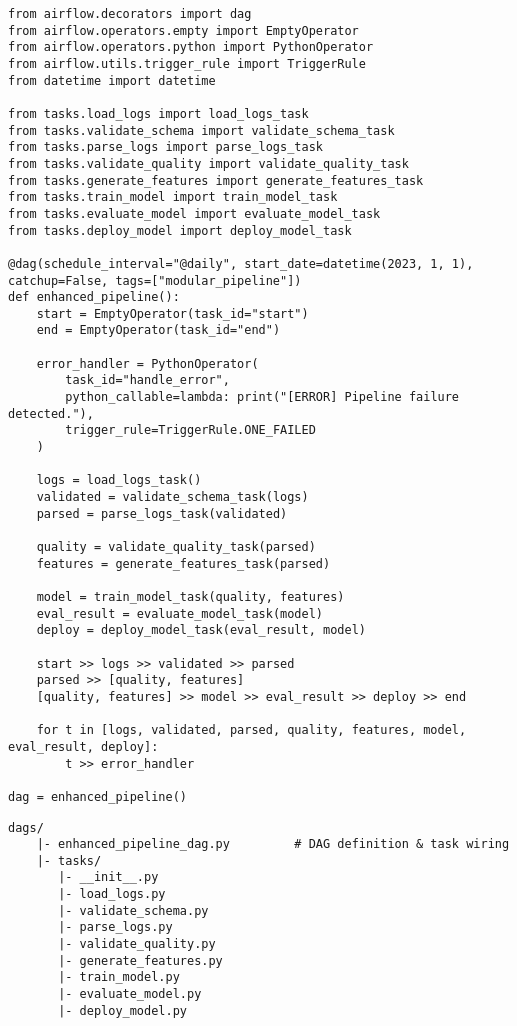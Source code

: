 \begin{lstlisting}[caption={Airflow DAG with parallel data quality validation and feature engineering before training.}, label={lst:airflowdag_parallel}]
from airflow.decorators import dag
from airflow.operators.empty import EmptyOperator
from airflow.operators.python import PythonOperator
from airflow.utils.trigger_rule import TriggerRule
from datetime import datetime

from tasks.load_logs import load_logs_task
from tasks.validate_schema import validate_schema_task
from tasks.parse_logs import parse_logs_task
from tasks.validate_quality import validate_quality_task
from tasks.generate_features import generate_features_task
from tasks.train_model import train_model_task
from tasks.evaluate_model import evaluate_model_task
from tasks.deploy_model import deploy_model_task

@dag(schedule_interval="@daily", start_date=datetime(2023, 1, 1), catchup=False, tags=["modular_pipeline"])
def enhanced_pipeline():
    start = EmptyOperator(task_id="start")
    end = EmptyOperator(task_id="end")

    error_handler = PythonOperator(
        task_id="handle_error",
        python_callable=lambda: print("[ERROR] Pipeline failure detected."),
        trigger_rule=TriggerRule.ONE_FAILED
    )

    logs = load_logs_task()
    validated = validate_schema_task(logs)
    parsed = parse_logs_task(validated)

    quality = validate_quality_task(parsed)
    features = generate_features_task(parsed)

    model = train_model_task(quality, features)
    eval_result = evaluate_model_task(model)
    deploy = deploy_model_task(eval_result, model)

    start >> logs >> validated >> parsed
    parsed >> [quality, features]
    [quality, features] >> model >> eval_result >> deploy >> end

    for t in [logs, validated, parsed, quality, features, model, eval_result, deploy]:
        t >> error_handler

dag = enhanced_pipeline()
\end{lstlisting}





\begin{lstlisting}[style=tree, caption={Modular DAG file structure (ASCII-safe)}, label={lst:dag_tree_ascii}]
    dags/
    |- enhanced_pipeline_dag.py         # DAG definition & task wiring
    |- tasks/
       |- __init__.py
       |- load_logs.py
       |- validate_schema.py
       |- parse_logs.py
       |- validate_quality.py
       |- generate_features.py
       |- train_model.py
       |- evaluate_model.py
       |- deploy_model.py
\end{lstlisting}



